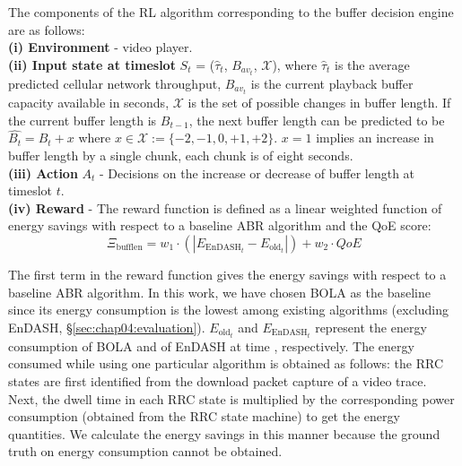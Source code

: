 \indent The components of the \ac{RL} algorithm corresponding to the buffer decision engine are as follows:\\
\noindent \textbf{(i) Environment}   - video player.\\
\noindent \textbf{(ii) Input state at timeslot } $S_t$ =  ($\hat{\tau}_{{t}}$, $B_{av_t}$, ${\mathcal{X}}$), where
  $\hat{\tau}_{{t}}$ is the  average predicted cellular network throughput,
 $B_{av_t}$ is the current playback buffer capacity available in seconds,
$\mathcal{X}$ is the set of possible changes in buffer length. If the current buffer length is $B_{t-1}$, the next buffer length can be predicted to be $\hat{B_t}= B_t+x$ where $x\in\mathcal{X}:=\{-2,-1,0,+1,+2\}$. $x=1$ implies an increase in buffer length by a single chunk, each chunk is of eight seconds.\\
\noindent \textbf{(iii) Action} $A_t$ - Decisions on the increase or decrease of buffer length at timeslot $t$. \\
\noindent \textbf{(iv) Reward} - The reward function is defined as a linear weighted function of energy savings with respect to a baseline ABR algorithm and the QoE score:
    \begin{equation}
    \Xi_{\mathrm{bufflen}} = w_1 \cdot (\left|E_{\mathrm{EnDASH}_t}-E_{\mathrm{old}_t}\right|)+w_2 \cdot QoE
    \end{equation}

\indent The first term in the reward function gives the energy savings with respect to a baseline ABR algorithm. In this work, we have chosen BOLA \cite{Spiteri2016} as the baseline since its energy consumption is the lowest among existing algorithms (excluding EnDASH, \S{\ref{sec:chap04:evaluation}}).  $E_{\mathrm{old}_t}$ and $E_{\mathrm{EnDASH}_t}$ represent the energy consumption of BOLA and of EnDASH at time , respectively. The energy consumed while using one particular algorithm is obtained as follows:  the RRC states are first identified from the download packet capture of a video trace. Next, the dwell time in each RRC state is multiplied by the corresponding power consumption (obtained from the RRC state machine) to get the energy quantities. We calculate the energy savings in this manner because the ground truth on energy consumption cannot be obtained.

